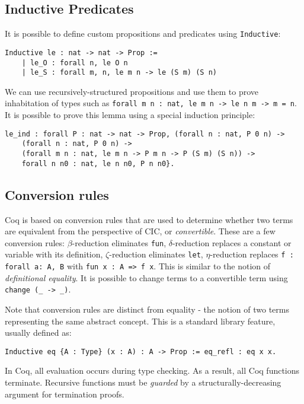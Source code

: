 \subsection{Inductive Predicates}

It is possible to define custom propositions and predicates using \lstinline{Inductive}:
\begin{lstlisting}
Inductive le : nat -> nat -> Prop :=
	| le_O : forall n, le O n
	| le_S : forall m, n, le m n -> le (S m) (S n) 
\end{lstlisting}

We can use recursively-structured propositions and use them to prove inhabitation of types such as
\lstinline{forall m n : nat, le m n -> le n m -> m = n}. It is possible to prove this lemma using 
a special induction principle: 

\begin{lstlisting}
le_ind : forall P : nat -> nat -> Prop, (forall n : nat, P 0 n) -> 
	(forall n : nat, P 0 n) -> 
	(forall m n : nat, le m n -> P m n -> P (S m) (S n)) -> 
	forall n n0 : nat, le n n0, P n n0}.
\end{lstlisting}

\subsection{Conversion rules}
Coq is based on conversion rules that are used to determine whether two terms are equivalent from
the perspective of CIC, or \emph{convertible}.
These are a few conversion rules: $\beta$-reduction eliminates \lstinline{fun}, $\delta$-reduction replaces a constant
or variable with its definition, $\zeta$-reduction eliminates \lstinline{let}, $\eta$-reduction replaces 
\lstinline{f : forall a: A, B} with \lstinline{fun x : A => f x}. This is similar to the notion of 
\emph{definitional equality}. It is possible to change terms to a convertible term using \lstinline{change (_ -> _)}.

Note that conversion rules are distinct from equality - the notion of two terms representing the same abstract
concept. This is a standard library feature, usually defined as:
\begin{lstlisting}
Inductive eq {A : Type} (x : A) : A -> Prop := eq_refl : eq x x.
\end{lstlisting}

In Coq, all evaluation occurs during type checking. As a result, all Coq functions terminate. Recursive functions
must be \emph{guarded} by a structurally-decreasing argument for termination proofs.

